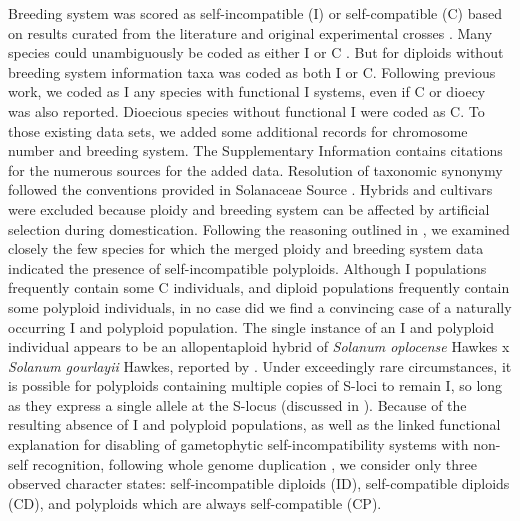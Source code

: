 %
Breeding system was scored as self-incompatible (I) or self-compatible (C) based on results curated from the literature and  original experimental crosses \citep[as compiled in][]{igic_2006, goldberg_2010, robertson_2011, goldberg_2012}.
Many species could unambiguously be coded as either I or C \citep{raduski_2012}.  But for diploids without breeding system information taxa was coded as both I or C. %
Following previous work, we coded as I any species with functional I systems, even if C or dioecy was also reported.
Dioecious species without functional I were coded as C.
To those existing data sets, we added some additional records for chromosome number and breeding system.
The Supplementary Information contains citations for the numerous sources for the added data. %
Resolution of taxonomic synonymy followed the conventions provided in Solanaceae Source \citep{solsource}. 
Hybrids and cultivars were excluded because ploidy and breeding system can be affected by artificial selection during domestication.
Following the reasoning outlined in \citet{robertson_2011}, we examined closely the few species for which the merged ploidy and breeding system data indicated the presence of self-incompatible polyploids.
Although I populations frequently contain some C individuals, and diploid populations frequently contain some polyploid individuals, in no case did we find a convincing case of a naturally occurring I and polyploid population.
The single instance of an I and polyploid individual appears to be an allopentaploid hybrid of {\em Solanum oplocense} Hawkes x {\em Solanum gourlayii} Hawkes, reported by \citealt{camadro_1981}.
Under exceedingly rare circumstances, it is possible for polyploids containing multiple copies of S-loci to remain I, so long as they express a single allele at the S-locus (discussed in \citealt{robertson_2011}).
Because of the resulting absence of I and polyploid populations, as well as the linked functional explanation for disabling of gametophytic self-incompatibility systems with non-self recognition, following whole genome duplication \citep[reviewed in][]{ramsey_1998,stone_2002}, we consider only three observed character states: self-incompatible diploids (ID), self-compatible diploids (CD), and polyploids which are always self-compatible (CP).

